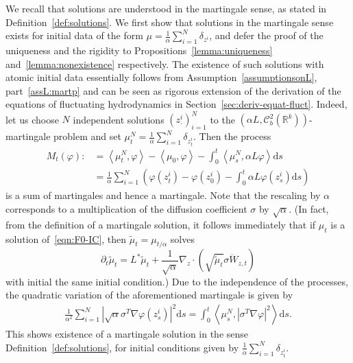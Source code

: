 \documentclass{article}
\newcommand{\dd}{\text{d}}
\newcommand{\av}[1]{\left<#1\right>}
\newcommand{\R}{\mathbb{R}}
\newcommand{\C}{\mathcal C}
\begin{document}
We recall that solutions are understood in the martingale sense, as stated in Definition~\ref{def:solutions}.
We first show that solutions in the martingale sense exists for initial data of the form
$\mu = \frac{1}{\alpha} \sum_{i =1}^N \delta_{z^i}$, and defer the proof of the uniqueness and the rigidity to
Propositions~\ref{lemma:uniqueness} and~\ref{lemma:nonexistence} respectively.  The existence of such
solutions with atomic initial data essentially follows from Assumption~\ref{assumptionsonL},
part~\ref{assL:martp} and can be seen as rigorous extension of the derivation of the equations of fluctuating
hydrodynamics in Section~\ref{sec:deriv-equat-fluct}. Indeed, let us choose $N$ independent solutions
$(z_\cdot^i)_{i =1}^N$ to the $\left(\alpha L, \C^2_b\left(\R^k\right)\right)$-martingale problem and set
$\mu_t^N = \frac{1}{\alpha} \sum_{i =1}^N\delta_{z_t^i}$. Then the process
\begin{align*}
  M_t(\varphi) :&=  \av{\mu_t^N, \varphi} - \av{\mu_0, \varphi} - \int_0^t  \av{\mu_s^N, \alpha L \varphi } \dd s\\
                & = \frac{1}{\alpha}\sum_{i = 1}^N \left(\varphi(z_t^i) -\varphi(z_0^i) - \int_0^t \alpha L \varphi(z_s^i) \dd s \right) 
\end{align*}
is a sum of martingales and hence a martingale.  Note that the rescaling by $\alpha$ corresponds to a
multiplication of the diffusion coefficient $\sigma$ by $\sqrt{\alpha}$.  (In fact, from the definition of a
martingale solution, it follows immediately that if $\mu_t$ is a solution of~\eqref{eqn:F0-IC}, then
$\tilde \mu_t=\mu_{t/\alpha}$ solves
\[   \partial_t \tilde\mu_t =  L^* \tilde \mu_t 
                       +\frac 1 {\sqrt \alpha}   \nabla_z \cdot \left( \sqrt{\tilde\mu_t} \sigma \dot{W}_{z,t} \right)\]
with initial the same initial condition.) Due to the independence of the processes, the
quadratic variation of the aforementioned martingale is given by
\begin{align*}
  \frac{1}{\alpha^2}\sum_{i = 1}^N |\sqrt{\alpha}\sigma^T \nabla \varphi(z_s^i)|^2 \dd s
  = \int_0^t \av{\mu_s^N, |\sigma^T \nabla \varphi|^2} \dd s.
\end{align*}
This shows existence of a martingale solution in the sense Definition~\ref{def:solutions}, for initial
conditions given by $\frac{1}{\alpha}\sum_{i =1}^N \delta_{z^i_t}$.

\smallskip
\end{document}
